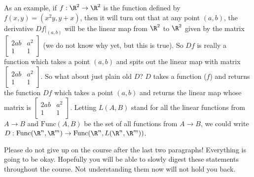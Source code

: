 \documentclass{ximera}
\begin{document}
As an example, if $f:\R^2 \to \R^2$ is the function defined by $f(x,y) = (x^2y,y+x)$, then it will turn out that at any point $(a,b)$,
 the derivative $Df\big|_{(a,b)}$ will be the linear map from $\R^2$ to $\R^2$ given by the matrix 
 $\begin{bmatrix}2ab & a^2\\ 1 & 1\end{bmatrix}$ (we do not know why yet, but this is true).  So $Df$ is really a 
 function which takes a point $(a,b)$ and spits out the linear map with matrix $\begin{bmatrix}2ab & a^2\\ 1 & 1\end{bmatrix}$. 
  So what about just plain old $D$?  $D$ takes a function ($f$) and returns the function $Df$ which takes a point $(a,b)$ and returns the linear map
  whose matrix is $\begin{bmatrix}2ab & a^2\\ 1 & 1\end{bmatrix}$.  Letting $L(A,B)$ stand for all the linear functions from 
  $A\to B$ and $\text{Func}(A,B)$ be the set of all functions from $A \to B$, we could write $D: \text{Func}(\R^n,\R^m) \to \text{Func}(\R^n,L(\R^n,\R^m))$.
  
  Please do not give up on the course after the last two paragraphs!  Everything is going to be okay.  Hopefully you will be able to slowly digest these statements 
  throughout the course.  Not understanding them now will not hold you back.
\end{document}
